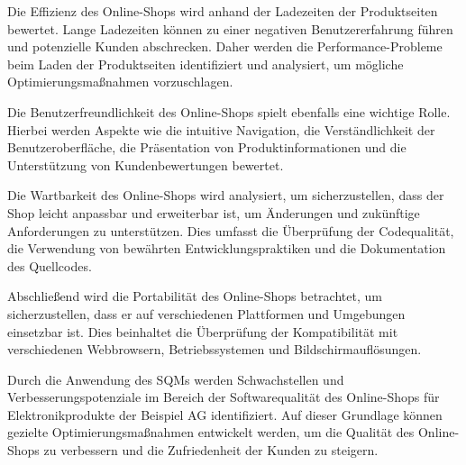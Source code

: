 Die Effizienz des Online-Shops wird anhand der Ladezeiten der Produktseiten bewertet. Lange Ladezeiten können zu einer negativen Benutzererfahrung führen und potenzielle Kunden abschrecken. Daher werden die Performance-Probleme beim Laden der Produktseiten identifiziert und analysiert, um mögliche Optimierungsmaßnahmen vorzuschlagen.

Die Benutzerfreundlichkeit des Online-Shops spielt ebenfalls eine wichtige Rolle. Hierbei werden Aspekte wie die intuitive Navigation, die Verständlichkeit der Benutzeroberfläche, die Präsentation von Produktinformationen und die Unterstützung von Kundenbewertungen bewertet.

Die Wartbarkeit des Online-Shops wird analysiert, um sicherzustellen, dass der Shop leicht anpassbar und erweiterbar ist, um Änderungen und zukünftige Anforderungen zu unterstützen. Dies umfasst die Überprüfung der Codequalität, die Verwendung von bewährten Entwicklungspraktiken und die Dokumentation des Quellcodes.

Abschließend wird die Portabilität des Online-Shops betrachtet, um sicherzustellen, dass er auf verschiedenen Plattformen und Umgebungen einsetzbar ist. Dies beinhaltet die Überprüfung der Kompatibilität mit verschiedenen Webbrowsern, Betriebssystemen und Bildschirmauflösungen.

Durch die Anwendung des SQMs werden Schwachstellen und Verbesserungspotenziale im Bereich der Softwarequalität des Online-Shops für Elektronikprodukte der Beispiel AG identifiziert. Auf dieser Grundlage können gezielte Optimierungsmaßnahmen entwickelt werden, um die Qualität des Online-Shops zu verbessern und die Zufriedenheit der Kunden zu steigern.